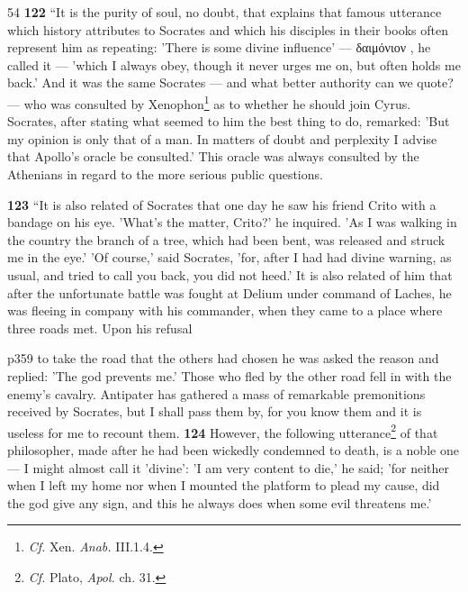 54
\textbf{122} ``It is the purity of soul, no doubt, that explains that famous utterance which history attributes to Socrates and which his disciples in their books often represent him as repeating: 'There is some divine influence' \texthebrew{—} \textgreek{δαιμόνιον} , he called it \texthebrew{—} 'which I always obey, though it never urges me on, but often holds me back.' And it was the same Socrates \texthebrew{—} and what better authority can we quote? \texthebrew{—} who was consulted by Xenophon\texthebrew{}\footnote{\emph{Cf.} Xen. \emph{Anab.} III.1.4.

} as to whether he should join Cyrus. Socrates, after stating what seemed to him the best thing to do, remarked: 'But my opinion is only that of a man. In matters of doubt and perplexity I advise that Apollo's oracle be consulted.' This oracle was always consulted by the Athenians in regard to the more serious public questions.

\textbf{123} ``It is also related of Socrates that one day he saw his friend Crito with a bandage on his eye. 'What's the matter, Crito?' he inquired. 'As I was walking in the country the branch of a tree, which had been bent, was released and struck me in the eye.' 'Of course,' said Socrates, 'for, after I had had divine warning, as usual, and tried to call you back, you did not heed.' It is also related of him that after the unfortunate battle was fought at Delium under command of Laches, he was fleeing in company with his commander, when they came to a place where three roads met. Upon his refusal

p359 to take the road that the others had chosen he was asked the reason and replied: 'The god prevents me.' Those who fled by the other road fell in with the enemy's cavalry. Antipater has gathered a mass of remarkable premonitions received by Socrates, but I shall pass them by, for you know them and it is useless for me to recount them. \textbf{124} However, the following utterance\texthebrew{}\footnote{\emph{Cf.} Plato, \emph{Apol.} ch. 31.

} of that philosopher, made after he had been wickedly condemned to death, is a noble one \texthebrew{—} I might almost call it 'divine': 'I am very content to die,' he said; 'for neither when I left my home nor when I mounted the platform to plead my cause, did the god give any sign, and this he always does when some evil threatens me.'

